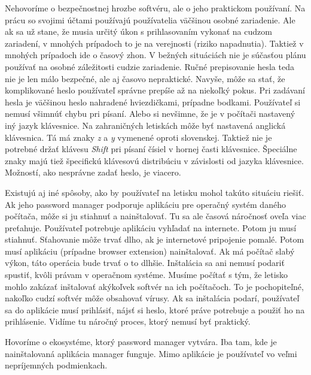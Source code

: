 Nehovoríme o bezpečnostnej hrozbe softvéru, ale o jeho praktickom používaní. Na prácu so svojimi účtami používajú používatelia väčšinou osobné zariadenie. Ale ak sa už stane, že musia určitý úkon s prihlasovaním vykonať na cudzom zariadení, v mnohých prípadoch to je na verejnosti (riziko napadnutia). Taktiež v mnohých prípadoch ide o časový zhon. V bežných situáciách nie je súčasťou plánu používať na osobné záležitosti cudzie zariadenie. Ručné prepisovanie hesla teda nie je len málo bezpečné, ale aj časovo nepraktické. Navyše, môže sa stať, že komplikované heslo používateľ správne prepíše až na niekoľký pokus. Pri zadávaní hesla je väčšinou heslo nahradené hviezdičkami, prípadne bodkami. Používateľ si nemusí všimnúť chybu pri písaní. Alebo si nevšimne, že je v počítači nastavený iný jazyk klávesnice. Na zahraničných letiskách môže byť nastavená anglická klávesnica. Tá má znaky \textit{z} a \textit{y} vymenené oproti slovenskej. Taktiež nie je potrebné držať klávesu \textit{Shift} pri písaní čísiel v hornej časti klávesnice. Špeciálne znaky majú tiež špecifickú klávesovú distribúciu v závislosti od jazyka klávesnice. Možností, ako nesprávne zadať heslo, je viacero. 

Existujú aj iné spôsoby, ako by používateľ na letisku mohol takúto situáciu riešiť. Ak jeho password manager podporuje aplikáciu pre operačný systém daného počítača, môže si ju stiahnuť a nainštalovať. Tu sa ale časová náročnosť oveľa viac preťahuje. Používateľ potrebuje aplikáciu vyhľadať na internete. Potom ju musí stiahnuť. Sťahovanie môže trvať dlho, ak je internetové pripojenie pomalé. Potom musí aplikáciu (prípadne browser extension) nainštalovať. Ak má počítač slabý výkon, táto operácia bude trvať o to dlhšie. Inštalácia sa ani nemusí podariť spustiť, kvôli právam v operačnom systéme. Musíme počítať s tým, že letisko mohlo zakázať inštalovať akýkoľvek softvér na ich počítačoch. To je pochopiteľné, nakoľko cudzí softvér môže obsahovať vírusy. Ak sa inštalácia podarí, používateľ sa do aplikácie musí prihlásiť, nájsť si heslo, ktoré práve potrebuje a použiť ho na prihlásenie. Vidíme tu náročný proces, ktorý nemusí byť praktický. 

Hovoríme o ekosystéme, ktorý password manager vytvára. Iba tam, kde je nainštalovaná aplikácia manager funguje. Mimo aplikácie je používateľ vo veľmi nepríjemných podmienkach. 